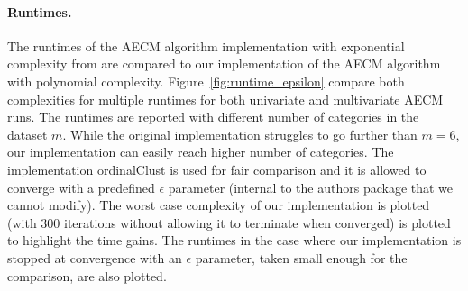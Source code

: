 \paragraph{Runtimes.}
The runtimes of the AECM algorithm implementation with exponential complexity from \citet{biernacki2016model} 
are compared to our implementation of the AECM algorithm with polynomial complexity. Figure~\ref{fig:runtime_epsilon}  compare both complexities for multiple runtimes for both univariate and multivariate AECM runs. The runtimes are reported with different number of categories in the dataset $m$. While the original implementation struggles to go further than $m=6$, our implementation can easily reach higher number of categories. The implementation ordinalClust \cite{selosse2021ordinalclust} is used for fair comparison and it is allowed to converge with a predefined $\epsilon$ parameter (internal to the authors package that we cannot modify). 
The worst case complexity of our implementation is plotted (with $300$ iterations without allowing it to terminate when converged) is plotted to highlight the time gains. The runtimes in the case where our implementation is stopped at convergence with an $\epsilon$ parameter, taken small enough for the comparison, are also plotted.
